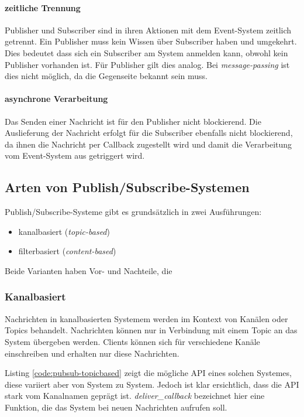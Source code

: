 \paragraph{zeitliche Trennung}
Publisher und Subscriber sind in ihren Aktionen mit dem Event-System zeitlich getrennt. Ein Publisher muss kein Wissen über Subscriber haben und umgekehrt. Dies bedeutet dass sich ein Subscriber am System anmelden kann, obwohl kein Publisher vorhanden ist. Für Publisher gilt dies analog. Bei \emph{message-passing} ist dies nicht möglich, da die Gegenseite bekannt sein muss.

\paragraph{asynchrone Verarbeitung}
Das Senden einer Nachricht ist für den Publisher nicht blockierend. Die Auslieferung der Nachricht erfolgt für die Subscriber ebenfalls nicht blockierend, da ihnen die Nachricht per Callback zugestellt wird und damit die Verarbeitung vom Event-System aus getriggert wird.


\subsection{Arten von Publish/Subscribe-Systemen}
Publish/Subscribe-Systeme gibt es grundsätzlich in zwei Ausführungen:
\begin{itemize}
\item kanalbasiert (\emph{topic-based})
\item filterbasiert (\emph{content-based})
\end{itemize}

Beide Varianten haben Vor- und Nachteile, die 

\subsubsection{Kanalbasiert}
\label{chap:grundlagen:pubsub:kanalbasiert}
Nachrichten in kanalbasierten Systemem werden im Kontext von Kanälen oder Topics behandelt. Nachrichten können nur in Verbindung mit einem Topic an das System übergeben werden. Clients können sich für verschiedene Kanäle einschreiben und erhalten nur diese Nachrichten.

Listing \vref{code:pubsub-topicbased} zeigt die mögliche API eines solchen Systemes, diese variiert aber von System zu System. Jedoch ist klar ersichtlich, dass die API stark vom Kanalnamen geprägt ist. \emph{deliver\_callback} bezeichnet hier eine Funktion, die das System bei neuen Nachrichten aufrufen soll.

